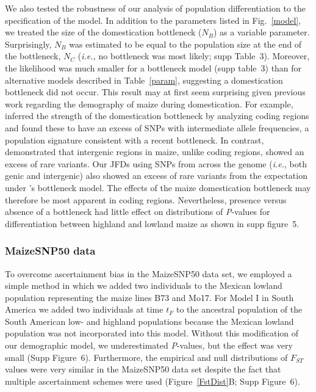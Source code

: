 We also tested the robustness of our analysis of population differentiation to the specification of the model.  
In addition to the parameters listed in Fig.~\ref{model}, we treated the size of the domestication bottleneck  ($N_B$) as a variable parameter.  
Surprisingly, $N_B$ was estimated to be equal to the population size at the end of the bottleneck, $N_C$ (\emph{i.e.,} no bottleneck was most likely; supp Table~3).  
Moreover, the likelihood was much smaller for a bottleneck model (supp table~3) than for alternative models described in Table~\ref{param}, suggesting a domestication bottleneck did not occur.
This result may at first seem surprising given previous work regarding the demography of maize during domestication.  For example, \cite{Wright_2005_15919994} inferred the strength of the domestication bottleneck by analyzing coding regions and found these to have an excess of SNPs with intermediate allele frequencies, a population signature consistent with a recent bottleneck.  
In contrast, \cite{Hufford_2012_22660546} demonstrated that intergenic regions in maize, unlike coding regions, showed an excess of rare variants.
Our JFDs using SNPs from across the genome (\emph{i.e.}, both genic and intergenic) also showed an excess of rare variants from the expectation under \cite{Wright_2005_15919994}'s bottleneck model.
The effects of the maize domestication bottleneck may therefore be most apparent in coding regions.
 Nevertheless, presence versus absence of a bottleneck had little effect on distributions of \emph{P}-values for differentiation between highland and lowland maize as shown in supp figure~5.  %
 


\subsubsection{MaizeSNP50 data}To overcome ascertainment bias in the MaizeSNP50 data set, we employed a simple method in which we added two individuals to the Mexican lowland population representing the maize lines B73 and Mo17. For Model I in South America we added two individuals at time $t_F$ to the ancestral population of the South American low- and highland populations because the Mexican lowland population was not incorporated into this model.  Without this modification of our demographic model, we underestimated \emph{P}-values, but the effect was very small (Supp Figure~6).   Furthermore, the empirical and null distributions of $F_{ST}$ values were very similar in the MaizeSNP50 data set despite the fact that multiple ascertainment schemes were used (Figure~\ref{FstDist}B; Supp Figure~6). 

